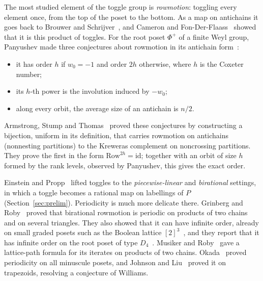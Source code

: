 \documentclass[11pt]{amsart}
\theoremstyle{definition}
\newcommand{\Row}{\mathrm{Row}}
\begin{document}
The most studied element of the toggle group is \emph{rowmotion}: toggling every element once, from the top of the poset to the bottom. As a map on antichains it goes back to Brouwer and Schrijver~\cite{BS}, and Cameron and Fon-Der-Flaass~\cite{CFF} showed that it is this product of toggles. For the root poset $\Phi^+$ of a finite Weyl group, Panyushev made three conjectures about rowmotion in its antichain form~\cite[Conj.~2.1]{Pan}:
\begin{itemize}
\item it has order $h$ if $w_0=-1$ and order $2h$ otherwise, where $h$ is the Coxeter number;
\item its $h$-th power is the involution induced by $-w_0$;
\item along every orbit, the average size of an antichain is $n/2$.
\end{itemize}
Armstrong, Stump and Thomas~\cite[Thm.~1.2]{AST} proved these conjectures by constructing a bijection, uniform in its definition, that carries rowmotion on antichains (nonnesting partitions) to the Kreweras complement on noncrossing partitions. They prove the first in the form $\Row^{2h}=\mathrm{id}$; together with an orbit of size $h$ formed by the rank levels, observed by Panyushev, this gives the exact order.

Einstein and Propp~\cite{EP} lifted toggles to the \emph{piecewise-linear} and \emph{birational} settings, in which a toggle becomes a rational map on labellings of $P$ (Section~\ref{sec:prelim}). Periodicity is much more delicate there. Grinberg and Roby~\cite{GR1,GR2} proved that birational rowmotion is periodic on products of two chains and on several triangles. They also showed that it can have infinite order, already on small graded posets such as the Boolean lattice $[2]^3$~\cite[\S20]{GR1}, and they report that it has infinite order on the root poset of type $D_4$~\cite[\S21]{GR1}. Musiker and Roby~\cite{MR} gave a lattice-path formula for its iterates on products of two chains. Okada~\cite{Oka} proved periodicity on all minuscule posets, and Johnson and Liu~\cite{JL} proved it on trapezoids, resolving a conjecture of Williams.
\end{document}
